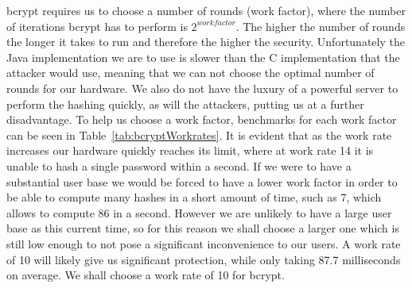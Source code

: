 \documentclass[12pt, titlepage]{article}
\begin{document}
\newline bcrypt requires us to choose a number of rounds (work factor), where the number of iterations bcrypt has to perform is $2^{workfactor}$. The higher the number of rounds the longer it takes to run and therefore the higher the security. Unfortunately the Java implementation we are to use is slower than the C implementation that the attacker would use, meaning that we can not choose the optimal number of rounds for our hardware. We also do not have the luxury of a powerful server to perform the hashing quickly, as will the attackers, putting us at a further disadvantage. To help us choose a work factor, benchmarks for each work factor can be seen in Table~\ref{tab:bcryptWorkrates}. It is evident that as the work rate increases our hardware quickly reaches its limit, where at work rate 14 it is unable to hash a single password within a second. If we were to have a substantial user base we would be forced to have a lower work factor in order to be able to compute many hashes in a short amount of time, such as 7, which allows to compute 86 in a second. However we are unlikely to have a large user base as this current time, so for this reason we shall choose a larger one which is still low enough to not pose a significant inconvenience to our users. A work rate of 10 will likely give us significant protection, while only taking 87.7 milliseconds on average. We shall choose a work rate of 10 for bcrypt.
\end{document}
